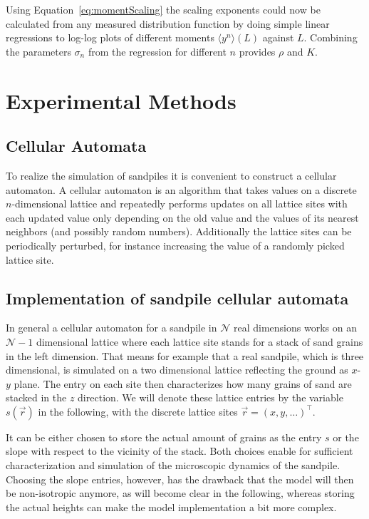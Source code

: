 Using Equation~\eqref{eq:momentScaling} the scaling exponents could now be calculated from any measured distribution
function by doing simple linear regressions to log-log plots of different moments $\langle y^n\rangle (L)$ against $L$.
Combining the parameters $\sigma_n$ from the regression for different $n$ provides $\rho$ and $K$.

\section{Experimental Methods}
\label{sec:experiment}

\subsection{Cellular Automata}
\label{sec:cellularAutomata}
To realize the simulation of sandpiles it is convenient to construct a cellular automaton.
A cellular automaton is an algorithm that takes values on a discrete $n$-dimensional lattice and repeatedly performs
updates on all lattice sites with each updated value only depending on the old value and the values of its nearest
neighbors (and possibly random numbers). Additionally the lattice sites can be periodically perturbed, for instance
increasing the value of a randomly picked lattice site.

\subsection{Implementation of sandpile cellular automata}
\label{sec:sandpileImplementation}
In general a cellular automaton for a sandpile in $\mathcal{N}$ real dimensions works on an $\mathcal{N}-1$ dimensional
lattice where each lattice site stands for a stack of sand grains in the left dimension. That means for example that
a real sandpile, which is three dimensional, is simulated on a two dimensional lattice reflecting the ground as $x$-$y$
plane. The entry on each site then characterizes how many grains of sand are stacked in the $z$ direction.
We will denote these lattice entries by the variable $s(\vec{r})$ in the following, with the discrete lattice sites
$\vec{r}=(x,y,\ldots)^\top$.

It can be either chosen to store the actual amount of grains as the entry $s$ or the slope with respect to the
vicinity of the stack. Both choices enable for sufficient characterization and simulation of the microscopic
dynamics of the sandpile. Choosing the slope entries, however, has the drawback that the model will then be
non-isotropic anymore, as will become clear in the following, whereas storing the actual heights can make the model
implementation a bit more complex.

